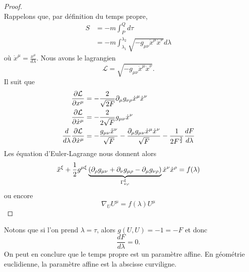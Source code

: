 \documentclass[a4paper,11pt]{report}
\begin{document}
            \begin{proof}${}$\\
                Rappelons que, par définition du temps propre,
                \begin{align}
                    S &= -m\int_P^Q d\tau\\
                    &= -m\int_{\lambda_1}^{\lambda_2}\sqrt{-g_{\mu\nu}\dot{x}^\mu\dot{x}^\nu}d\lambda
                \end{align}
                où $\dot{x}^\mu = \frac{x^\mu}{d\lambda}$. Nous avons le lagrangien
                \begin{equation}
                    \mathcal{L} = \sqrt{-g_{\mu\nu}\dot{x}^\mu\dot{x}^\nu}.
                \end{equation}
                Il suit que
                \begin{align}
                    \pdv{\mathcal{L}}{x^\mu} &= -\frac{2}{\sqrt{2F}}\partial_\mu g_{\nu\rho}\dot{x}^\mu\dot{x}^\nu \\
                    \pdv{\mathcal{L}}{\dot{x}^\mu} &= -\frac{2}{2\sqrt{F}}g_{\mu\nu}\dot{x}^\nu\\
                    \frac{d}{d\lambda}\pdv{\mathcal{L}}{\dot{x}^\mu} &= -\frac{g_{\mu\nu}\ddot{x}^\nu}{\sqrt{F}}-\frac{\partial_\mu g_{\mu\nu} \dot{x}^\mu\dot{x}^\nu}{\sqrt{F}}-\frac{1}{2F^{\frac{3}{2}}}\frac{dF}{d\lambda}
                \end{align}
                Les équation d'Euler-Lagrange nous donnent alors
                \begin{equation}
                    \ddot{x}^\xi + \frac{1}{2}g^{\mu\xi}\underbrace{\left( \partial_\rho g_{\mu\nu}+\partial_\nu g_{\mu\rho} - \partial_\mu g_{\nu\rho} \right)}_{\Gamma^\xi_{\nu\rho}}\dot{x}^\nu\dot{x}^\rho = f(\lambda)
                \end{equation}
                ou encore
                \begin{equation}
                    \nabla_U U^\mu = f(\lambda)U^\mu
                \end{equation}
            \end{proof}
            
            Notons que si l'on prend $\lambda = \tau$, alors $g(U,U) = -1 = -F$ et donc
            \begin{equation}
                \frac{dF}{d\lambda} = 0.
            \end{equation}
            On peut en conclure que le temps propre est un paramètre affine. En géométrie euclidienne, la paramètre affine est la abscisse curviligne.
            
\end{document}
